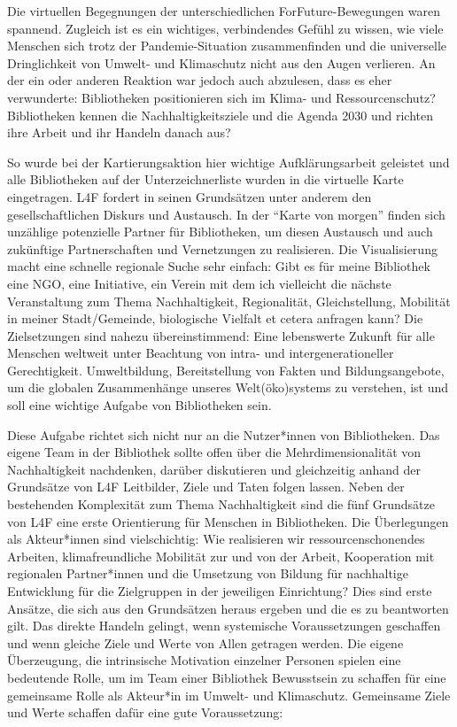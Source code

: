 \documentclass[a4paper,
fontsize=11pt,
oneside,
numbers=noperiodatend,
parskip=half-,
bibliography=totoc,
final
]{scrartcl}
\begin{document}
Die virtuellen Begegnungen der unterschiedlichen ForFuture-Bewegungen
waren spannend. Zugleich ist es ein wichtiges, verbindendes Gefühl zu
wissen, wie viele Menschen sich trotz der Pandemie-Situation
zusammenfinden und die universelle Dringlichkeit von Umwelt- und
Klimaschutz nicht aus den Augen verlieren. An der ein oder anderen
Reaktion war jedoch auch abzulesen, dass es eher verwunderte:
Bibliotheken positionieren sich im Klima- und Ressourcenschutz?
Bibliotheken kennen die Nachhaltigkeitsziele und die Agenda 2030 und
richten ihre Arbeit und ihr Handeln danach aus?

So wurde bei der Kartierungsaktion hier wichtige Aufklärungsarbeit
geleistet und alle Bibliotheken auf der Unterzeichnerliste wurden in die
virtuelle Karte eingetragen. L4F fordert in seinen Grundsätzen unter
anderem den gesellschaftlichen Diskurs und Austausch. In der
\enquote{Karte von morgen} finden sich unzählige potenzielle Partner für
Bibliotheken, um diesen Austausch und auch zukünftige Partnerschaften
und Vernetzungen zu realisieren. Die Visualisierung macht eine schnelle
regionale Suche sehr einfach: Gibt es für meine Bibliothek eine NGO,
eine Initiative, ein Verein mit dem ich vielleicht die nächste
Veranstaltung zum Thema Nachhaltigkeit, Regionalität, Gleichstellung,
Mobilität in meiner Stadt/Gemeinde, biologische Vielfalt et cetera
anfragen kann? Die Zielsetzungen sind nahezu übereinstimmend: Eine
lebenswerte Zukunft für alle Menschen weltweit unter Beachtung von
intra- und intergenerationeller Gerechtigkeit. Umweltbildung,
Bereitstellung von Fakten und Bildungsangebote, um die globalen
Zusammenhänge unseres Welt(öko)systems zu verstehen, ist und soll eine
wichtige Aufgabe von Bibliotheken sein.

Diese Aufgabe richtet sich nicht nur an die Nutzer*innen von
Bibliotheken. Das eigene Team in der Bibliothek sollte offen über die
Mehrdimensionalität von Nachhaltigkeit nachdenken, darüber diskutieren
und gleichzeitig anhand der Grundsätze von L4F Leitbilder, Ziele und
Taten folgen lassen. Neben der bestehenden Komplexität zum Thema
Nachhaltigkeit sind die fünf Grundsätze von L4F eine erste Orientierung
für Menschen in Bibliotheken. Die Überlegungen als Akteur*innen sind
vielschichtig: Wie realisieren wir ressourcenschonendes Arbeiten,
klimafreundliche Mobilität zur und von der Arbeit, Kooperation mit
regionalen Partner*innen und die Umsetzung von Bildung für nachhaltige
Entwicklung für die Zielgruppen in der jeweiligen Einrichtung? Dies sind
erste Ansätze, die sich aus den Grundsätzen heraus ergeben und die es zu
beantworten gilt. Das direkte Handeln gelingt, wenn systemische
Voraussetzungen geschaffen und wenn gleiche Ziele und Werte von Allen
getragen werden. Die eigene Überzeugung, die intrinsische Motivation
einzelner Personen spielen eine bedeutende Rolle, um im Team einer
Bibliothek Bewusstsein zu schaffen für eine gemeinsame Rolle als
Akteur*in im Umwelt- und Klimaschutz. Gemeinsame Ziele und Werte
schaffen dafür eine gute Voraussetzung:
\end{document}

